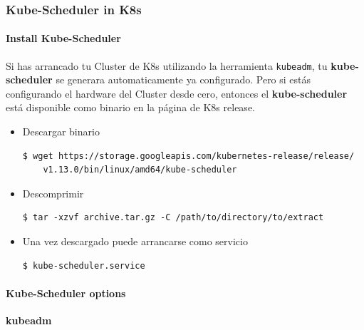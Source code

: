 \documentclass{article}
\newenvironment{codetemplate}[1][]{%
  \mybasecolorbox[#1]
  \itshape
}{%
  \endmybasecolorbox
}
\begin{document}
\subsubsection{Kube-Scheduler in K8s}
\label{schduler}

\paragraph{Install Kube-Scheduler}

Si has arrancado tu Cluster de K8s utilizando la herramienta \verb|kubeadm|, tu \textbf{kube-scheduler} se generara automaticamente ya configurado. Pero si estás configurando el hardware del Cluster desde cero, entonces el \textbf{kube-scheduler} está disponible como binario en la página de K8s release.

\begin{itemize}
    \item Descargar binario
\begin{codetemplate}{}
\begin{verbatim}
$ wget https://storage.googleapis.com/kubernetes-release/release/
    v1.13.0/bin/linux/amd64/kube-scheduler
\end{verbatim}
\end{codetemplate}

    \item Descomprimir
\begin{codetemplate}{}
\begin{verbatim}
$ tar -xzvf archive.tar.gz -C /path/to/directory/to/extract
\end{verbatim}
\end{codetemplate} 

    \item Una vez descargado puede arrancarse como servicio
\begin{codetemplate}{}
\begin{verbatim}
$ kube-scheduler.service
\end{verbatim}
\end{codetemplate}
\end{itemize}

\paragraph{Kube-Scheduler options}

\textbf{kubeadm}
\end{document}
